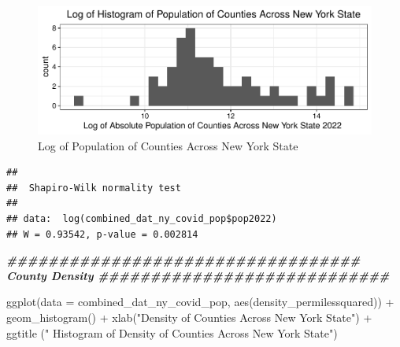 \documentclass[
  12pt,
]{article}
\newenvironment{Shaded}{\begin{snugshade}}{\end{snugshade}}
\newcommand{\AttributeTok}[1]{\textcolor[rgb]{0.77,0.63,0.00}{#1}}
\newcommand{\CommentTok}[1]{\textcolor[rgb]{0.56,0.35,0.01}{\textit{#1}}}
\newcommand{\DocumentationTok}[1]{\textcolor[rgb]{0.56,0.35,0.01}{\textbf{\textit{#1}}}}
\newcommand{\FunctionTok}[1]{\textcolor[rgb]{0.00,0.00,0.00}{#1}}
\newcommand{\NormalTok}[1]{#1}
\newcommand{\SpecialCharTok}[1]{\textcolor[rgb]{0.00,0.00,0.00}{#1}}
\newcommand{\StringTok}[1]{\textcolor[rgb]{0.31,0.60,0.02}{#1}}
\begin{document}
\begin{figure}

{\centering \includegraphics{EDA_Final_Group_Project_files/figure-latex/unnamed-chunk-9-1} 

}

\caption{Log of Population of Counties Across New York State}\label{fig:unnamed-chunk-9}
\end{figure}

\begin{Shaded}
\end{Shaded}

\begin{verbatim}
## 
##  Shapiro-Wilk normality test
## 
## data:  log(combined_dat_ny_covid_pop$pop2022)
## W = 0.93542, p-value = 0.002814
\end{verbatim}

\begin{Shaded}
\begin{Highlighting}[]
\DocumentationTok{\#\#\#\#\#\#\#\#\#\#\#\#\#\#\#\#\#\#\#\#\#\#\#\#\#\#\#\#\#\#\#\#\#\# County Density \#\#\#\#\#\#\#\#\#\#\#\#\#\#\#\#\#\#\#\#\#\#\#\#\#\#\#\#}

\FunctionTok{ggplot}\NormalTok{(}\AttributeTok{data =}\NormalTok{ combined\_dat\_ny\_covid\_pop, }\FunctionTok{aes}\NormalTok{(density\_permilessquared)) }\SpecialCharTok{+}
  \FunctionTok{geom\_histogram}\NormalTok{() }\SpecialCharTok{+}
  \FunctionTok{xlab}\NormalTok{(}\StringTok{"Density of Counties Across New York State"}\NormalTok{) }\SpecialCharTok{+}
  \FunctionTok{ggtitle}\NormalTok{ (}\StringTok{" Histogram of Density of Counties Across New York State"}\NormalTok{)}
\end{Highlighting}
\end{Shaded}
\end{document}
